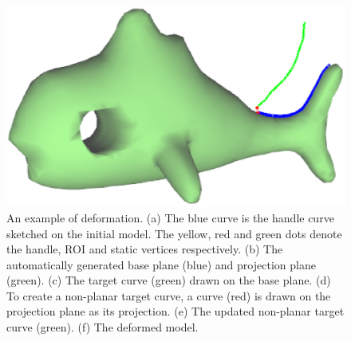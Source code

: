\begin{figure} [htbp]
{    \begin{minipage}[b]{0.3\textwidth}
      \centering
      \includegraphics[scale=0.15]{figs/f3.fish-deform-5.eps}
    \end{minipage}}
  \caption{An example of deformation. 
  (a) The blue curve is the handle curve sketched on the initial model.
  The yellow, red and green dots denote the handle, ROI and static vertices respectively. 
  (b) The automatically generated base plane (blue) and projection plane (green). 
  (c) The target curve (green) drawn on the base plane. 
  (d) To create a non-planar target curve, a curve (red) is drawn on the projection plane as its
  projection. 
  (e) The updated non-planar target curve (green). 
  (f) The deformed model.}
  \label{fig:deform} %
\end{figure}

